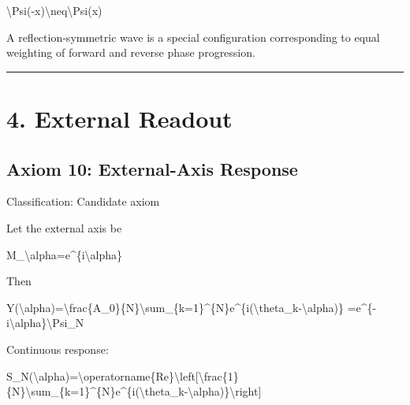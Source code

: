\documentclass[
  a4paper,
]{article}
\newenvironment{Shaded}{}{}
\newcommand{\NormalTok}[1]{#1}
\begin{document}
\begin{Shaded}
\begin{Highlighting}[]
\NormalTok{\textbackslash{}Psi({-}x)\textbackslash{}neq\textbackslash{}Psi(x)}
\end{Highlighting}
\end{Shaded}

A reflection-symmetric wave is a special configuration corresponding to
equal weighting of forward and reverse phase progression.

\begin{center}\rule{0.5\linewidth}{0.5pt}\end{center}

\section{4. External Readout}\label{external-readout}

\subsection{Axiom 10: External-Axis
Response}\label{axiom-10-external-axis-response}

Classification: Candidate axiom

Let the external axis be

\begin{Shaded}
\begin{Highlighting}[]
\NormalTok{M\_\textbackslash{}alpha=e\^{}\{i\textbackslash{}alpha\}}
\end{Highlighting}
\end{Shaded}

Then

\begin{Shaded}
\begin{Highlighting}[]
\NormalTok{Y(\textbackslash{}alpha)=\textbackslash{}frac\{A\_0\}\{N\}\textbackslash{}sum\_\{k=1\}\^{}\{N\}e\^{}\{i(\textbackslash{}theta\_k{-}\textbackslash{}alpha)\}}
\NormalTok{=e\^{}\{{-}i\textbackslash{}alpha\}\textbackslash{}Psi\_N}
\end{Highlighting}
\end{Shaded}

Continuous response:

\begin{Shaded}
\begin{Highlighting}[]
\NormalTok{S\_N(\textbackslash{}alpha)=\textbackslash{}operatorname\{Re\}\textbackslash{}left[\textbackslash{}frac\{1\}\{N\}\textbackslash{}sum\_\{k=1\}\^{}\{N\}e\^{}\{i(\textbackslash{}theta\_k{-}\textbackslash{}alpha)\}\textbackslash{}right]}
\end{Highlighting}
\end{Shaded}
\end{document}
